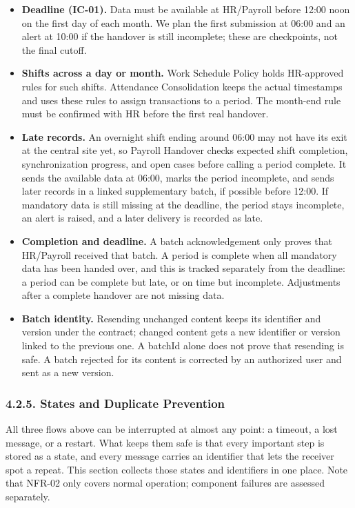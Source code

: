\begin{itemize}[leftmargin=36pt, itemsep=2pt, topsep=4pt, parsep=2pt]
  \item \textbf{Deadline (IC-01).} Data must be available at HR/Payroll before 12:00 noon on the first day of each month. We plan the first submission at 06:00 and an alert at 10:00 if the handover is still incomplete; these are checkpoints, not the final cutoff.
  \item \textbf{Shifts across a day or month.} Work Schedule Policy holds HR-approved rules for such shifts. Attendance Consolidation keeps the actual timestamps and uses these rules to assign transactions to a period. The month-end rule must be confirmed with HR before the first real handover.
  \item \textbf{Late records.} An overnight shift ending around 06:00 may not have its exit at the central site yet, so Payroll Handover checks expected shift completion, synchronization progress, and open cases before calling a period complete. It sends the available data at 06:00, marks the period incomplete, and sends later records in a linked supplementary batch, if possible before 12:00. If mandatory data is still missing at the deadline, the period stays incomplete, an alert is raised, and a later delivery is recorded as late.
  \item \textbf{Completion and deadline.} A batch acknowledgement only proves that HR/Payroll received that batch. A period is complete when all mandatory data has been handed over, and this is tracked separately from the deadline: a period can be complete but late, or on time but incomplete. Adjustments after a complete handover are not missing data.
  \item \textbf{Batch identity.} Resending unchanged content keeps its identifier and version under the contract; changed content gets a new identifier or version linked to the previous one. A batchId alone does not prove that resending is safe. A batch rejected for its content is corrected by an authorized user and sent as a new version.
\end{itemize}

\subsubsection*{4.2.5. States and Duplicate Prevention}

{}

All three flows above can be interrupted at almost any point: a timeout, a lost message, or a restart. What keeps them safe is that every important step is stored as a state, and every message carries an identifier that lets the receiver spot a repeat. This section collects those states and identifiers in one place. Note that NFR-02 only covers normal operation; component failures are assessed separately.

